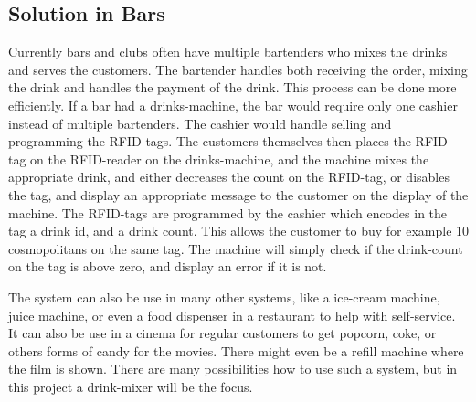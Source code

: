 \subsection{Solution in Bars}
\label{SolutionInBars}
Currently bars and clubs often have multiple bartenders who mixes the drinks and serves the customers. The bartender handles both receiving the order, mixing the drink and handles the payment of the drink. This process can be done more efficiently. If a bar had a drinks-machine, the bar would require only one cashier instead of multiple bartenders. The cashier would handle selling and programming the RFID-tags. The customers themselves then places the RFID-tag on the RFID-reader on the drinks-machine, and the machine mixes the appropriate drink, and either decreases the count on the RFID-tag, or disables the tag, and display an appropriate message to the customer on the display of the machine. The RFID-tags are programmed by the cashier which encodes in the tag a drink id, and a drink count. This allows the customer to buy for example 10 cosmopolitans on the same tag. The machine will simply check if the drink-count on the tag is above zero, and display an error if it is not.

The system can also be use in many other systems, like a ice-cream machine, juice machine, or even a food dispenser in a restaurant to help with self-service. It can also be use in a cinema for regular customers to get popcorn, coke, or others forms of candy for the movies. There might even be a refill machine where the film is shown. There are many possibilities how to use such a system, but in this project a drink-mixer will be the focus.